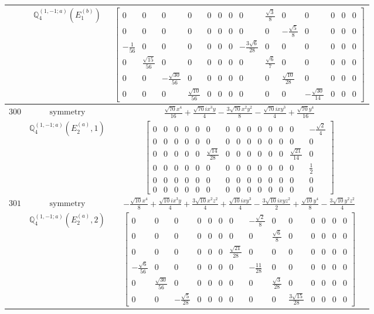 \documentclass[fleqn,8pt,landscape]{jsarticle}
\begin{document}
\begin{longtable}{ccc}
$  $ & $ \mathbb{Q}_{4}^{(1,-1;a)}(E_{1}^{(b)}) $ & $ \begin{bmatrix} 0 & 0 & 0 & 0 & 0 & 0 & 0 & 0 & \frac{\sqrt{3}}{8} & 0 & 0 & 0 & 0 & 0 \\ 0 & 0 & 0 & 0 & 0 & 0 & 0 & 0 & 0 & - \frac{\sqrt{5}}{8} & 0 & 0 & 0 & 0 \\ - \frac{1}{56} & 0 & 0 & 0 & 0 & 0 & 0 & - \frac{3 \sqrt{6}}{28} & 0 & 0 & 0 & 0 & 0 & 0 \\ 0 & \frac{\sqrt{15}}{56} & 0 & 0 & 0 & 0 & 0 & 0 & \frac{\sqrt{6}}{7} & 0 & 0 & 0 & 0 & 0 \\ 0 & 0 & - \frac{\sqrt{30}}{56} & 0 & 0 & 0 & 0 & 0 & 0 & \frac{\sqrt{10}}{28} & 0 & 0 & 0 & 0 \\ 0 & 0 & 0 & \frac{\sqrt{10}}{56} & 0 & 0 & 0 & 0 & 0 & 0 & - \frac{\sqrt{30}}{14} & 0 & 0 & 0 \end{bmatrix} $ \\ \hline
$ 300 $ & $ \text{symmetry} $ & $ \frac{\sqrt{70} x^{4}}{16} + \frac{\sqrt{70} i x^{3} y}{4} - \frac{3 \sqrt{70} x^{2} y^{2}}{8} - \frac{\sqrt{70} i x y^{3}}{4} + \frac{\sqrt{70} y^{4}}{16} $ \\
$  $ & $ \mathbb{Q}_{4}^{(1,-1;a)}(E_{2}^{(a)},1) $ & $ \begin{bmatrix} 0 & 0 & 0 & 0 & 0 & 0 & 0 & 0 & 0 & 0 & 0 & 0 & 0 & - \frac{\sqrt{2}}{4} \\ 0 & 0 & 0 & 0 & 0 & 0 & 0 & 0 & 0 & 0 & 0 & 0 & 0 & 0 \\ 0 & 0 & 0 & 0 & 0 & \frac{\sqrt{14}}{28} & 0 & 0 & 0 & 0 & 0 & 0 & \frac{\sqrt{21}}{14} & 0 \\ 0 & 0 & 0 & 0 & 0 & 0 & 0 & 0 & 0 & 0 & 0 & 0 & 0 & \frac{1}{2} \\ 0 & 0 & 0 & 0 & 0 & 0 & 0 & 0 & 0 & 0 & 0 & 0 & 0 & 0 \\ 0 & 0 & 0 & 0 & 0 & 0 & 0 & 0 & 0 & 0 & 0 & 0 & 0 & 0 \end{bmatrix} $ \\ \hline
$ 301 $ & $ \text{symmetry} $ & $ - \frac{\sqrt{10} x^{4}}{8} + \frac{\sqrt{10} i x^{3} y}{4} + \frac{3 \sqrt{10} x^{2} z^{2}}{4} + \frac{\sqrt{10} i x y^{3}}{4} - \frac{3 \sqrt{10} i x y z^{2}}{2} + \frac{\sqrt{10} y^{4}}{8} - \frac{3 \sqrt{10} y^{2} z^{2}}{4} $ \\
$  $ & $ \mathbb{Q}_{4}^{(1,-1;a)}(E_{2}^{(a)},2) $ & $ \begin{bmatrix} 0 & 0 & 0 & 0 & 0 & 0 & 0 & - \frac{\sqrt{2}}{8} & 0 & 0 & 0 & 0 & 0 & 0 \\ 0 & 0 & 0 & 0 & 0 & 0 & 0 & 0 & \frac{\sqrt{6}}{8} & 0 & 0 & 0 & 0 & 0 \\ 0 & 0 & 0 & 0 & 0 & 0 & \frac{\sqrt{21}}{28} & 0 & 0 & 0 & 0 & 0 & 0 & 0 \\ - \frac{\sqrt{6}}{56} & 0 & 0 & 0 & 0 & 0 & 0 & - \frac{11}{28} & 0 & 0 & 0 & 0 & 0 & 0 \\ 0 & \frac{\sqrt{30}}{56} & 0 & 0 & 0 & 0 & 0 & 0 & \frac{\sqrt{3}}{28} & 0 & 0 & 0 & 0 & 0 \\ 0 & 0 & - \frac{\sqrt{5}}{28} & 0 & 0 & 0 & 0 & 0 & 0 & \frac{3 \sqrt{15}}{28} & 0 & 0 & 0 & 0 \end{bmatrix} $ \\ \hline

\end{longtable}
\end{document}
